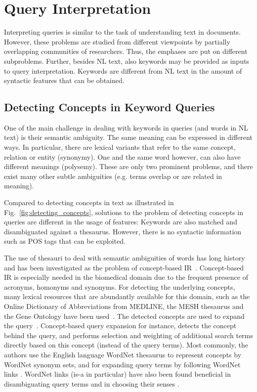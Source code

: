 \section{Query Interpretation}\label{sec:query} 
	Interpreting queries is similar to the task of understanding text in documents. However, these problems are studied from different viewpoints by partially overlapping communities of researchers. Thus, the emphases are put on different subproblems. Further, besides NL text, also keywords may be provided as inputs to query interpretation. Keywords are different from NL text in the amount of syntactic features that can be obtained. 
	
\subsection{Detecting Concepts in Keyword Queries} One of the main challenge in dealing with keywords in queries (and words in NL text) is their semantic ambiguity. The same meaning can be expressed in different ways. In particular, there are lexical variants that refer to the same concept, relation or entity (synonymy). One and the same word however, can also have different meanings (polysemy). These are only two prominent problems, and there exist many other subtle ambiguities (e.g. terms overlap or are related in meaning). 

Compared to detecting concepts in text as illustrated in Fig.~\ref{fig:detecting_concepts}, solutions to the problem of detecting concepts in queries are different in the usage of features: Keywords are also matched and disambiguated against a thesaurus. However, there is no syntactic information such as POS tags that can be exploited. 

The use of thesauri to deal with semantic ambiguities of words has long history and has been investigated as the problem of concept-based IR~\cite{DBLP:conf/sigir/Giger88}. Concept-based IR is especially needed in the biomedical domain due to the frequent presence of acronyms, homonyms and synonyms. For detecting the underlying concepts, many lexical resources that are abundantly available for this domain, such as the Online Dictionary of Abbreviations from MEDLINE, the MESH thesaurus and the Gene Ontology have been used~\cite{DBLP:conf/sigir/ZhongH06,DBLP:conf/trec/JelierSEWMSMK03}. The detected concepts are used to expand the query~\cite{DBLP:conf/sigir/QiuF93,DBLP:conf/trec/JelierSEWMSMK03}. Concept-based query expansion \cite{DBLP:conf/sigir/QiuF93} for instance, detects the concept behind the query, and performs selection and weighting of additional search terms directly based on this concept (instead of the query terms). Most commonly, the authors use the English language WordNet thesaurus to represent concepts by WordNet synonym sets, and for expanding query terms by following WordNet links \cite{DBLP:conf/sigir/Voorhees93}. WordNet links (is-a in particular) have also been found beneficial in disambiguating query terms and in choosing their senses \cite{DBLP:conf/sigir/Voorhees94}. 

